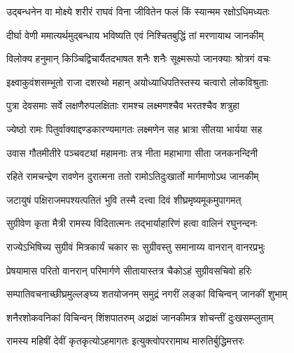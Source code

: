 
\textlink{}
\translink{}

\storymeta


\twolineshloka
{उद्बन्धनेन वा मोक्ष्ये शरीरं राघवं विना}
{जीवितेन फलं किं स्यान्मम रक्षोऽधिमध्यतः} %

\twolineshloka
{दीर्घा वेणी ममात्यर्थमुद्बन्धाय भविष्यति}
{एवं निश्चितबुद्धिं तां मरणायाथ जानकीम्} %

\twolineshloka
{विलोक्य हनुमान् किञ्चिद्विचार्यैतदभाषत}
{शनैः शनैः सूक्ष्मरूपो जानक्याः श्रोत्रगं वचः} %

\twolineshloka
{इक्ष्वाकुवंशसम्भूतो राजा दशरथो महान्}
{अयोध्याधिपतिस्तस्य चत्वारो लोकविश्रुताः} %

\twolineshloka
{पुत्रा देवसमाः सर्वे लक्षणैरुपलक्षिताः}
{रामश्च लक्ष्मणश्चैव भरतश्चैव शत्रुहा} %

\twolineshloka
{ज्येष्ठो रामः पितुर्वाक्याद्दण्डकारण्यमागतः}
{लक्ष्मणेन सह भ्रात्रा सीतया भार्यया सह} %

\twolineshloka
{उवास गौतमीतीरे पञ्चवट्यां महामनाः}
{तत्र नीता महाभागा सीता जनकनन्दिनी} %

\twolineshloka
{रहिते रामचन्द्रेण रावणेन दुरात्मना}
{ततो रामोऽतिदुःखार्तो मार्गमाणोऽथ जानकीम्} %

\twolineshloka
{जटायुषं पक्षिराजमपश्यत्पतितं भुवि}
{तस्मै दत्त्वा दिवं शीघ्रमृष्यमूकमुपागमत्} %

\twolineshloka
{सुग्रीवेण कृता मैत्री रामस्य विदितात्मनः}
{तद्भार्याहारिणं हत्वा वालिनं रघुनन्दनः} %

\twolineshloka
{राज्येऽभिषिच्य सुग्रीवं मित्रकार्यं चकार सः}
{सुग्रीवस्तु समानाय्य वानरान् वानरप्रभुः} %

\twolineshloka
{प्रेषयामास परितो वानरान् परिमार्गणे}
{सीतायास्तत्र चैकोऽहं सुग्रीवसचिवो हरिः} %

\twolineshloka
{सम्पातिवचनाच्छीघ्रमुल्लङ्घ्य शतयोजनम्}
{समुद्रं नगरीं लङ्कां विचिन्वन् जानकीं शुभाम्} %

\twolineshloka
{शनैरशोकवनिकां विचिन्वन् शिंशपातरुम्}
{अद्राक्षं जानकीमत्र शोचन्तीं दुःखसम्प्लुताम्} %

\twolineshloka
{रामस्य महिषीं देवीं कृतकृत्योऽहमागतः}
{इत्युक्त्वोपररामाथ मारुतिर्बुद्धिमत्तरः} %

